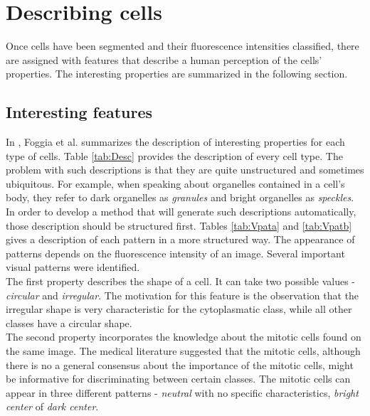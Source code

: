 
\chapter{Describing cells} %

\label{Chapter6} %


Once cells have been segmented and their fluorescence intensities classified, there are assigned with features that describe a human perception of the cells' properties. The interesting properties are summarized in the following section. 



\section{Interesting features}

In \cite{FoggiaBenchmarks2013}, Foggia et al. summarizes the description of interesting properties for each type of cells. Table \ref{tab:Desc} provides the description of every cell type. The problem with such descriptions is that they are quite unstructured and sometimes ubiquitous. For example, when speaking about organelles contained in a cell's body, they refer to dark organelles as \textit{granules} and bright organelles as \textit{speckles}. \\

In order to develop a method that will generate such descriptions automatically, those description should be structured first. Tables \ref{tab:Vpata} and \ref{tab:Vpatb} gives a description of each pattern in a more structured way. The appearance of patterns depends on the fluorescence intensity of an image. Several important visual patterns were identified. \\

The first property describes the shape of a cell. It can take two possible values - \textit{circular} and \textit{irregular}. The motivation for this feature is the observation that the irregular shape is very characteristic for the cytoplasmatic class, while all other classes have a circular shape. \\

The second property incorporates the knowledge about the mitotic cells found on the same image. The medical literature suggested that the mitotic cells, although there is no a general consensus about the importance of the mitotic cells, might be informative for discriminating between certain classes. The mitotic cells can appear in three different patterns - \textit{neutral} with no specific characteristics, \textit{bright center} of \textit{dark center}. \\

